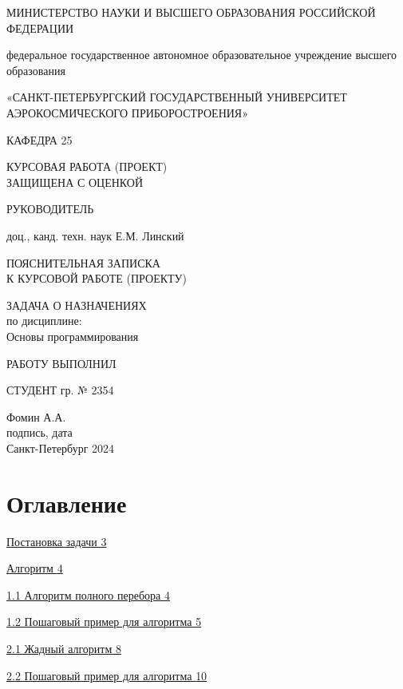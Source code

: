 \documentclass[]{article}
\author{Алексей Фомин}
\date{}
\begin{document}
МИНИСТЕРСТВО НАУКИ И ВЫСШЕГО ОБРАЗОВАНИЯ РОССИЙСКОЙ ФЕДЕРАЦИИ

федеральное государственное автономное образовательное учреждение
высшего образования

«САНКТ-ПЕТЕРБУРГСКИЙ ГОСУДАРСТВЕННЫЙ УНИВЕРСИТЕТ\\
АЭРОКОСМИЧЕСКОГО ПРИБОРОСТРОЕНИЯ»

КАФЕДРА 25

КУРСОВАЯ РАБОТА (ПРОЕКТ)\\
ЗАЩИЩЕНА С ОЦЕНКОЙ

РУКОВОДИТЕЛЬ


доц., канд. техн. наук Е.М. Линский

ПОЯСНИТЕЛЬНАЯ ЗАПИСКА\\
К КУРСОВОЙ РАБОТЕ (ПРОЕКТУ)\strut


ЗАДАЧА О НАЗНАЧЕНИЯХ\\
по дисциплине: \\

Основы программирования

РАБОТУ ВЫПОЛНИЛ



СТУДЕНТ гр. № 2354

Фомин А.А.\\

подпись, дата \\



Санкт-Петербург 2024
\newpage
\hypertarget{Оглавление}{%
\section{Оглавление}\label{Оглавление}}

\protect\hyperlink{Постановка задачи}{Постановка
задачи
\protect\hyperlink{Постановка задачи}{3}}

\protect\hyperlink{Алгоритм}{Алгоритм
\protect\hyperlink{Алгоритм}{4}}

\protect\hyperlink{Алгоритм полного перебора}{1.1
Алгоритм полного перебора
\protect\hyperlink{Алгоритм полного перебоа}{4}}

\protect\hyperlink{ПошаговыйПП}{1.2
Пошаговый пример для алгоритма
\protect\hyperlink{ПошаговыйПП}{5}}

\protect\hyperlink{Жадный алгоритм}{2.1
Жадный алгоритм
\protect\hyperlink{Жадный алгоритм}{8}}

\protect\hyperlink{ПошаговыйЖА}{2.2
Пошаговый пример для алгоритма
\protect\hyperlink{ПошаговыйЖА}{10}}
\end{document}
